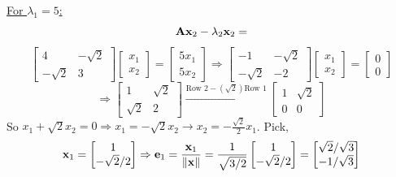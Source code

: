         \underline{For $\lambda_1 = 5$:}
        \[
            \bold{A}\bold{x}_2 - \lambda_2\bold{x}_2
            =
        \]
        \[
            \begin{bmatrix}
                4 & -\sqrt{2} \\
                -\sqrt{2} & 3
            \end{bmatrix}
            \begin{bmatrix}
                x_1 \\
                x_2
            \end{bmatrix}
            =
            \begin{bmatrix}
                5x_1 \\
                5x_2
            \end{bmatrix}
            \Rightarrow
            \begin{bmatrix}
                -1 & -\sqrt{2} \\
                -\sqrt{2} & -2
            \end{bmatrix}
            \begin{bmatrix}
                x_1 \\
                x_2
            \end{bmatrix}
            =
            \begin{bmatrix}
                0 \\
                0
            \end{bmatrix}
        \]
        \[
            \Rightarrow
            \begin{bmatrix}
                1 & \sqrt{2} \\
                \sqrt{2} & 2
            \end{bmatrix}
            \overset{\text{Row 2} - \left(\sqrt{2}\right)\text{Row 1}}{\longrightarrow}
            \begin{bmatrix}
                1 & \sqrt{2} \\
                0 & 0
            \end{bmatrix}
        \]
        So $x_1 + \sqrt{2}x_2 = 0 \Rightarrow x_1 = -\sqrt{2}x_2 \rightarrow x_2 = -\frac{\sqrt{2}}{2}x_1$. Pick,
        \[
            \bold{x}_1 
            =
            \begin{bmatrix}
                1 \\
                -\sqrt{2}/2
            \end{bmatrix}
            \Rightarrow
            \bold{e}_1
            =
            \frac{\bold{x}_1}{\left\|\bold{x}\right\|}
            =
            \frac{1}{\sqrt{3/2}}
            \begin{bmatrix}
                1 \\
                -\sqrt{2}/2
            \end{bmatrix}
            =
            \begin{bmatrix}
                \sqrt{2}/\sqrt{3} \\
                -1/\sqrt{3}
            \end{bmatrix}
        \]
